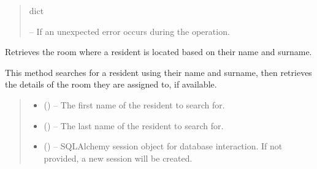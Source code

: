 \documentclass[letterpaper,10pt,english]{sphinxmanual}
\begin{document}
\begin{fulllineitems}
\begin{fulllineitems}
\begin{quote}
\begin{description}
\begin{description}
\end{description}


\sphinxAtStartPar
dict

\sphinxAtStartPar
{} – If an unexpected error occurs during the operation.

\end{description}\end{quote}

\end{fulllineitems}


\begin{fulllineitems}
\label{\detokenize{app.controllers:app.controllers.resident_controller.ResidentController.getResidentRoomByNameAndSurname}}
\pysigstartsignatures
\pysiglinewithargsret
{}
{\sphinxparamcomma {}\sphinxparamcomma {}}
{}
\pysigstopsignatures
\sphinxAtStartPar
Retrieves the room where a resident is located based on their name and surname.

\sphinxAtStartPar
This method searches for a resident using their name and surname, then retrieves
the details of the room they are assigned to, if available.
\begin{quote}\begin{description}
\begin{itemize}
\item {} 
\sphinxAtStartPar
{} () – The first name of the resident to search for.

\item {} 
\sphinxAtStartPar
{} () – The last name of the resident to search for.

\item {} 
\sphinxAtStartPar
{} (\sphinxstyleliteralemphasis{\sphinxupquote{, }}) – SQLAlchemy session object for database interaction.
If not provided, a new session will be created.


\end{itemize}
\end{description}
\end{quote}
\end{fulllineitems}
\end{fulllineitems}
\end{document}
